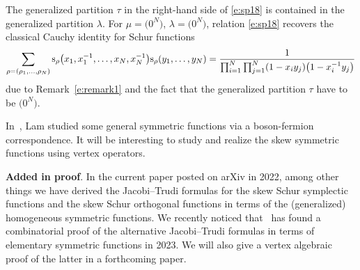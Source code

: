 \documentclass[pdftex]{sigma}
\numberwithin{equation}{section}
\begin{document}
\begin{Remark} The generalized partition $\tau$ in the right-hand side of \eqref{e:sp18} is contained in the generalized partition $\lambda$. For $\mu=\big(0^N\big)$, $\lambda=\big(0^N\big)$, relation \eqref{e:sp18} recovers the classical Cauchy identity for Schur functions
\begin{align*}
\sum_{\rho=(\rho_1,\dots,\rho_{N}) }{\rm s}_{\rho}\big(x_1,x^{-1}_1,\dots,x_N,x^{-1}_N\big){\rm s}_{\rho}(y_1,\dots,y_N)
=\frac{1}{\prod^N_{i=1}\prod^N_{j=1}(1-x_iy_j)\big(1-x^{-1}_iy_j\big)}
\end{align*}
due to Remark~\ref{e:remark1} and the fact that the generalized partition $\tau$ have to be $\big(0^N\big)$.
\end{Remark}
\begin{Remark}

In~\cite{Lam2006}, Lam studied some general symmetric functions via a boson-fermion correspondence. It will be interesting to study and realize the
skew symmetric functions using vertex operators.
\end{Remark}

{\bf Added in proof}. In the current paper posted on arXiv in 2022, among other things we have derived the Jacobi--Trudi formulas for the skew Schur symplectic functions and the skew Schur orthogonal functions in terms of the
(generalized) homogeneous symmetric functions. We recently noticed that~\cite{AFHS} has found a combinatorial proof of the alternative Jacobi--Trudi formulas in terms of elementary symmetric functions in 2023.
We will also give a vertex algebraic proof of the
latter in a forthcoming paper.

\appendix
\end{document}
